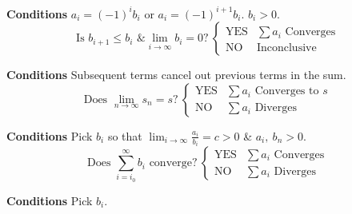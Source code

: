 \documentclass{article}
\theoremstyle{plain}
\numberwithin{theorem}{subsection}
\theoremstyle{definition}
\numberwithin{definition}{subsection}
\theoremstyle{remark}
\numberwithin{note}{subsection}
\begin{document}
\begin{multicols}{2}
\begin{mdframed}[style=exampledefaultcols,frametitle={Alternating Series}]
        \textbf{Conditions} $a_i = \left( -1 \right)^i b_i$ or $a_i = \left( -1 \right)^{i+1} b_i$. $b_i>0$.
        \begin{equation*}
            \text{Is $b_{i+1}\leqslant b_i$ \& $\lim_{i\to\infty}b_i=0$?}\:
            \begin{cases}
                \text{YES} & \text{$\sum a_i$ Converges} \\
                \text{NO}  & \text{Inconclusive}
            \end{cases}
        \end{equation*}
    \end{mdframed}
    \begin{mdframed}[style=exampledefaultcols,frametitle={Telescoping Series}]
        \textbf{Conditions} Subsequent terms cancel out previous terms in the sum.
        \begin{equation*}
            \text{Does $\lim_{n\to\infty}s_n=s$?}\:
            \begin{cases}
                \text{YES} & \text{$\sum a_i$ Converges to $s$} \\
                \text{NO}  & \text{$\sum a_i$ Diverges}
            \end{cases}
        \end{equation*}
    \end{mdframed}
    \begin{mdframed}[style=exampledefaultcols,frametitle={Limit Comparison Test}]
        \textbf{Conditions} Pick $b_i$ so that $\displaystyle \lim_{i\to\infty}\frac{a_i}{b_i}=c>0$ \& $a_i,\:b_n>0$.
        \begin{equation*}
            \text{Does $\sum_{i=i_0}^\infty b_i$ converge?}\:
            \begin{cases}
                \text{YES} & \text{$\sum a_i$ Converges} \\
                \text{NO}  & \text{$\sum a_i$ Diverges}
            \end{cases}
        \end{equation*}
    \end{mdframed}
    \begin{mdframed}[style=exampledefaultcols,frametitle={Comparison Test}]
        \textbf{Conditions} Pick $b_i$.


\end{mdframed}
\end{multicols}
\end{document}
